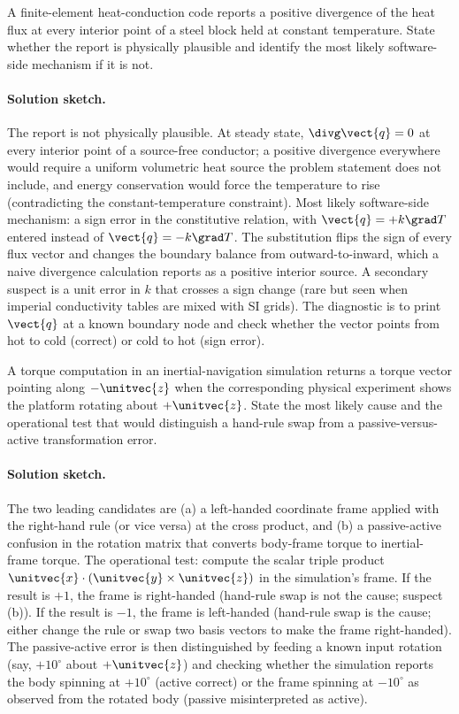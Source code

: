\begin{exercise}
A finite-element heat-conduction code reports a positive divergence
of the heat flux at every interior point of a steel block held at
constant temperature. State whether the report is physically
plausible and identify the most likely software-side mechanism if it
is not.

\paragraph{Solution sketch.} The report is not physically plausible.
At steady state, $\divg\vect{q} = 0$ at every interior point of a
source-free conductor; a positive divergence everywhere would
require a uniform volumetric heat source the problem statement does
not include, and energy conservation would force the temperature to
rise (contradicting the constant-temperature constraint). Most
likely software-side mechanism: a sign error in the constitutive
relation, with $\vect{q} = +k\grad T$ entered instead of $\vect{q}
= -k\grad T$. The substitution flips the sign of every flux vector
and changes the boundary balance from outward-to-inward, which a
naive divergence calculation reports as a positive interior
source. A secondary suspect is a unit error in $k$ that crosses a
sign change (rare but seen when imperial conductivity tables are
mixed with SI grids). The diagnostic is to print $\vect{q}$ at a
known boundary node and check whether the vector points from hot to
cold (correct) or cold to hot (sign error).
\end{exercise}

\begin{exercise}
A torque computation in an inertial-navigation simulation returns a
torque vector pointing along $-\unitvec{z}$ when the corresponding
physical experiment shows the platform rotating about $+\unitvec{z}$.
State the most likely cause and the operational test that would
distinguish a hand-rule swap from a passive-versus-active
transformation error.

\paragraph{Solution sketch.} The two leading candidates are (a) a
left-handed coordinate frame applied with the right-hand rule (or
vice versa) at the cross product, and (b) a passive-active confusion
in the rotation matrix that converts body-frame torque to
inertial-frame torque. The operational test: compute the scalar
triple product $\unitvec{x}\cdot(\unitvec{y}\times\unitvec{z})$ in
the simulation's frame. If the result is $+1$, the frame is
right-handed (hand-rule swap is not the cause; suspect (b)). If the
result is $-1$, the frame is left-handed (hand-rule swap is the
cause; either change the rule or swap two basis vectors to make the
frame right-handed). The passive-active error is then distinguished
by feeding a known input rotation (say, $+10^{\circ}$ about
$+\unitvec{z}$) and checking whether the simulation reports the body
spinning at $+10^{\circ}$ (active correct) or the frame spinning at
$-10^{\circ}$ as observed from the rotated body (passive
misinterpreted as active).
\end{exercise}

